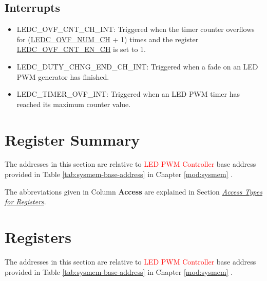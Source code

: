 \documentclass[main\_\_EN.tex]{subfiles}
\begin{document}
\subsection{Interrupts}
\begin{itemize}
\item \label{int:ledc-ovf-cnt}LEDC\_OVF\_CNT\_CH\_INT: Triggered when the timer counter overflows for (\hyperref[fielddesc:LEDCOVFNUMCHN]{LEDC\_OVF\_NUM\_CH} + 1) times and the register \hyperref[fielddesc:LEDCOVFCNTENCHN]{LEDC\_OVF\_CNT\_EN\_CH} is set to 1.
\item \label{int:ledc-duty-chng-end}LEDC\_DUTY\_CHNG\_END\_CH\_INT: Triggered when a fade on an LED PWM generator has finished.
\item \label{int:ledc-timer-ovf}LEDC\_TIMER\_OVF\_INT: Triggered when an LED PWM timer has reached its maximum counter value.
\end{itemize}



\clearpage
\hypertarget{ledpwm-reg-summ}{}
\section{Register Summary}
\label{sec:ledpwm-reg-summ}

The addresses in this section are relative to \textcolor{red}{LED PWM Controller} base address provided in Table \ref{tab:sysmem-base-address} in Chapter \ref{mod:sysmem} \textit{}.

The abbreviations given in Column \textbf{Access} are explained in Section \hyperref[glossary-access-types]{\textit{Access Types for Registers}}.






\clearpage
\section{Registers}

The addresses in this section are relative to \textcolor{red}{LED PWM Controller} base address provided in Table \ref{tab:sysmem-base-address} in Chapter \ref{mod:sysmem} \textit{}.


\end{document}
